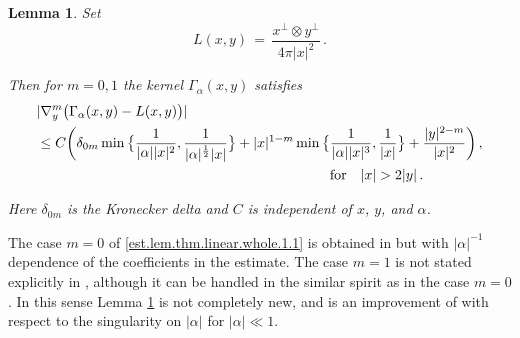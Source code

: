 \documentclass[11pt,a4paper]{article}
\newtheorem{lemma}[theorem]{Lemma}
\begin{document}
\begin{lemma}\label{lem.thm.linear.whole.1} Set
%
\begin{equation}\label{def.Lxy}
L(x,y) \, = \, \frac{x^{\perp}\otimes y^{\perp}}{4\pi |x|^2}\,. 
\end{equation}

\noindent Then for $m=0,1$ the kernel $\Gamma_{\alpha}(x,y)$ satisfies
%
\begin{equation}\label{est.lem.thm.linear.whole.1.1}
\begin{split}
& | \nabla_y ^m \big ( \Gamma_{\alpha}(x,y)- L(x,y) \big ) | \\
& \le
C \bigg ( \delta_{0m} \min \big\{ \frac{1}{|\alpha| |x|^2}, \frac{1}{|\alpha|^{\frac{1}{2}} |x|} \big\}
+  |x|^{1-m} 
\min \big\{ \frac{1}{|\alpha| |x|^3}, \frac{1}{|x|} \big\} 
+  \frac{|y|^{2-m}} {|x|^2}\bigg )\,,\\
&  \quad\quad\quad\quad\quad \quad\quad\quad\quad\quad\quad \quad\quad \quad\quad\quad \quad\quad\quad\quad\quad  {\rm for}   \quad |x|> 2 |y|\,.
\end{split}
\end{equation}

\noindent
Here $\delta_{0m}$ is the Kronecker delta and $C$ is independent of $x$, $y$, and $\alpha$.

 
\end{lemma}


\begin{remark} The case $m=0$ of \eqref{est.lem.thm.linear.whole.1.1} is obtained in \cite[Proposition 3.1]{H3} but with $|\alpha|^{-1}$ dependence of the coefficients in the estimate. The case $m=1$ is not stated explicitly in \cite{H3}, 
although it can be handled in the similar spirit as in the case $m=0$. In this sense Lemma \ref{lem.thm.linear.whole.1} is not completely new, and is an improvement of \cite[Proposition 3.1]{H3} with respect to the singularity on $|\alpha|$ 
for $|\alpha|\ll 1$.
\end{remark}
\end{document}
